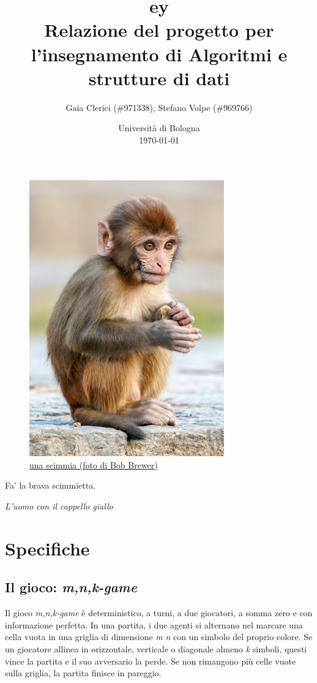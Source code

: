 \documentclass[a4paper]{article}
\title{
  {
    \fontspec[ Path = fonts/ ]{Symbola}
    \symbol{"1F17C}\symbol{"1F435}\symbol{"1F17D}\symbol{"1F17A}ey
  } \large \\
  \small Relazione del progetto per l'insegnamento di Algoritmi e strutture di
  dati
}
\author{
  Gaia Clerici (\#971338),
  Stefano Volpe (\#969766)
}
\date{
	Universit\`a di Bologna \\
  \today
}
\begin{document}
\maketitle

\begin{figure}[h]
  \includegraphics[width=0.75\textwidth]{monkey}
  \centering
  \caption{\href{https://unsplash.com/photos/daC7ji1EMHM}{una scimmia
  (foto di Bob Brewer)}}
\end{figure}

\pagebreak

\epigraph{Fa' la brava scimmietta.}{\textit{L'uomo con il cappello giallo}}

\tableofcontents

\section{Specifiche}

\subsection{Il gioco: \emph{m,n,k-game}}

Il gioco \emph{m,n,k-game} è deterministico, a turni, a due giocatori, a somma
zero e con informazione perfetta. In una partita, i due agenti si alternano nel
marcare una cella vuota in una griglia di dimensione \emph{m} \times \emph{n}
con un simbolo del proprio colore. Se un giocatore allinea in orizzontale,
verticale o diagonale almeno \emph{k} simboli, questi vince la partita e il suo
avversario la perde. Se non rimangono più celle vuote sulla griglia, la partita
finisce in pareggio.
\end{document}
